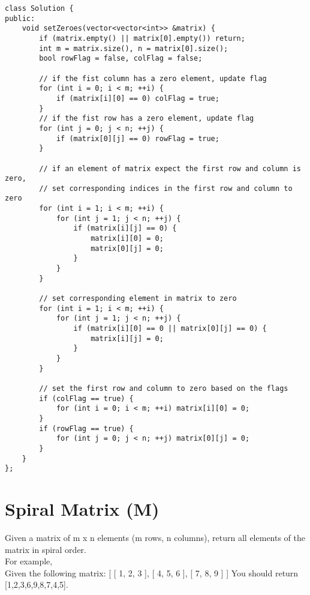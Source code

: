 \begin{lstlisting}
class Solution {
public:
    void setZeroes(vector<vector<int>> &matrix) {
        if (matrix.empty() || matrix[0].empty()) return;
        int m = matrix.size(), n = matrix[0].size();
        bool rowFlag = false, colFlag = false;
        
        // if the fist column has a zero element, update flag
        for (int i = 0; i < m; ++i) {
            if (matrix[i][0] == 0) colFlag = true;
        }
        // if the fist row has a zero element, update flag
        for (int j = 0; j < n; ++j) {
            if (matrix[0][j] == 0) rowFlag = true;
        }
        
        // if an element of matrix expect the first row and column is zero,
        // set corresponding indices in the first row and column to zero
        for (int i = 1; i < m; ++i) {
            for (int j = 1; j < n; ++j) {
                if (matrix[i][j] == 0) {
                    matrix[i][0] = 0;
                    matrix[0][j] = 0;
                }
            }
        }
        
        // set corresponding element in matrix to zero
        for (int i = 1; i < m; ++i) {
            for (int j = 1; j < n; ++j) {
                if (matrix[i][0] == 0 || matrix[0][j] == 0) {
                    matrix[i][j] = 0;
                }
            }
        }
        
        // set the first row and column to zero based on the flags
        if (colFlag == true) {
            for (int i = 0; i < m; ++i) matrix[i][0] = 0;
        }
        if (rowFlag == true) {
            for (int j = 0; j < n; ++j) matrix[0][j] = 0;
        }
    }
};
\end{lstlisting}


\section{Spiral Matrix (M)}
Given a matrix of m x n elements (m rows, n columns), return all elements of the matrix in spiral order.\\

For example,\\
Given the following matrix:
[
 [ 1, 2, 3 ],
 [ 4, 5, 6 ],
 [ 7, 8, 9 ]
]
You should return [1,2,3,6,9,8,7,4,5]. \\

